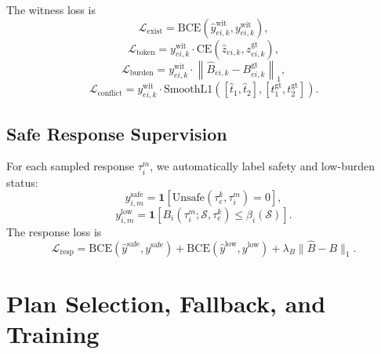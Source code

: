 \documentclass[10pt]{article}
\begin{document}
The witness loss is
\begin{equation}
    \mathcal{L}_{\mathrm{exist}}
    =
    \mathrm{BCE}
    (
    \widehat{y}^{\mathrm{wit}}_{ei,k},
    y^{\mathrm{wit}}_{ei,k}
    ),
\end{equation}
\begin{equation}
    \mathcal{L}_{\mathrm{token}}
    =
    y^{\mathrm{wit}}_{ei,k}
    \cdot
    \mathrm{CE}
    (
    \widehat{z}_{ei,k},
    z^{\mathrm{gt}}_{ei,k}
    ),
\end{equation}
\begin{equation}
    \mathcal{L}_{\mathrm{burden}}
    =
    y^{\mathrm{wit}}_{ei,k}
    \cdot
    \left\|
    \widehat{B}_{ei,k}
    -
    B^{\mathrm{gt}}_{ei,k}
    \right\|_1,
\end{equation}
\begin{equation}
    \mathcal{L}_{\mathrm{conflict}}
    =
    y^{\mathrm{wit}}_{ei,k}
    \cdot
    \mathrm{SmoothL1}
    \left(
    [\widehat{t}_1,\widehat{t}_2],
    [t^{\mathrm{gt}}_1,t^{\mathrm{gt}}_2]
    \right).
\end{equation}

\subsection{Safe Response Supervision}
\label{app:response_loss}

For each sampled response $\tau_i^m$, we automatically label safety and low-burden status:
\begin{equation}
    y^{\mathrm{safe}}_{i,m}
    =
    \mathbf{1}
    [
    \mathrm{Unsafe}(\tau^k_e,\tau_i^m)=0
    ],
\end{equation}
\begin{equation}
    y^{\mathrm{low}}_{i,m}
    =
    \mathbf{1}
    [
    B_i(\tau_i^m;\mathcal{S},\tau^k_e)
    \le
    \beta_i(\mathcal{S})
    ].
\end{equation}
The response loss is
\begin{equation}
    \mathcal{L}_{\mathrm{resp}}
    =
    \mathrm{BCE}(\widehat{y}^{\mathrm{safe}},y^{\mathrm{safe}})
    +
    \mathrm{BCE}(\widehat{y}^{\mathrm{low}},y^{\mathrm{low}})
    +
    \lambda_B
    \|\widehat{B}-B\|_1 .
\end{equation}

\section{Plan Selection, Fallback, and Training}
\label{app:selection_training}
\end{document}
